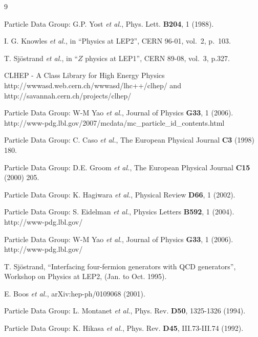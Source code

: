 
\def\etal{{\it et al.}}

\begin{thebibliography}{9}

Particle Data Group: G.P. Yost \etal, Phys. Lett. {\bf B204}, 1 (1988).

I. G. Knowles \etal, in ``Physics at LEP2'', CERN 96-01, vol.~2, p.~103.

T. Sj\"ostrand \etal, in ``$Z$ physics at LEP1'', CERN 89-08, vol.~3, p.327.

CLHEP - A Class Library for High Energy Physics
http://wwwasd.web.cern.ch/wwwasd/lhc++/clhep/ and
http://savannah.cern.ch/projects/clhep/

Particle Data Group: W-M Yao \etal, Journal of Physics {\bf G33}, 1 (2006).
http://www-pdg.lbl.gov/2007/mcdata/mc\_particle\_id\_contents.html

Particle Data Group: C. Caso \etal, The European Physical Journal {\bf C3} (1998) 180.

Particle Data Group: D.E. Groom \etal, The European Physical Journal {\bf C15} (2000) 205.

Particle Data Group: K. Hagiwara \etal, Physical Review {\bf D66}, 1 (2002).

Particle Data Group: S. Eidelman \etal, Physics Letters {\bf B592}, 1 (2004).
http://www-pdg.lbl.gov/

Particle Data Group: W-M Yao \etal, Journal of Physics {\bf G33}, 1 (2006).
http://www-pdg.lbl.gov/

T. Sj\"ostrand, ``Interfacing four-fermion generators with  QCD generators'',
Workshop on Physics at LEP2, (Jan. to Oct. 1995).

E. Boos \etal, arXiv:hep-ph/0109068 (2001).

Particle Data Group: L. Montanet \etal, Phys. Rev. {\bf D50}, 1325-1326 (1994).

Particle Data Group: K. Hikasa \etal, Phys. Rev. {\bf D45}, III.73-III.74 (1992).

\end{thebibliography}
\newpage
